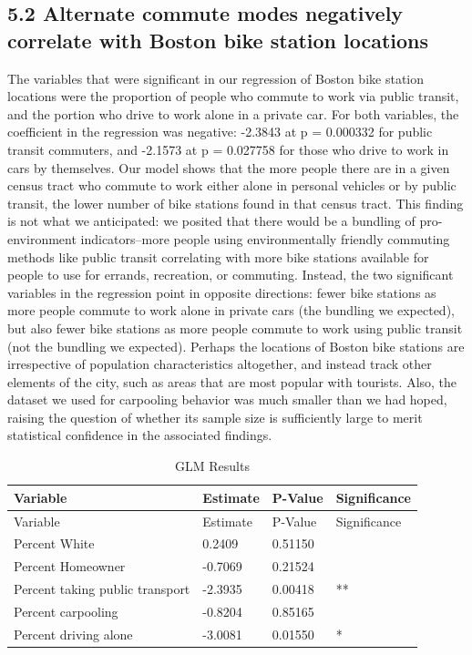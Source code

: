 \documentclass[
  12pt,
]{article}
\begin{document}
\hypertarget{alternate-commute-modes-negatively-correlate-with-boston-bike-station-locations-1}{%
\subsection{5.2 Alternate commute modes negatively correlate with Boston
bike station
locations}\label{alternate-commute-modes-negatively-correlate-with-boston-bike-station-locations-1}}

The variables that were significant in our regression of Boston bike
station locations were the proportion of people who commute to work via
public transit, and the portion who drive to work alone in a private
car. For both variables, the coefficient in the regression was negative:
-2.3843 at p = 0.000332 for public transit commuters, and -2.1573 at p =
0.027758 for those who drive to work in cars by themselves. Our model
shows that the more people there are in a given census tract who commute
to work either alone in personal vehicles or by public transit, the
lower number of bike stations found in that census tract. This finding
is not what we anticipated: we posited that there would be a bundling of
pro-environment indicators--more people using environmentally friendly
commuting methods like public transit correlating with more bike
stations available for people to use for errands, recreation, or
commuting. Instead, the two significant variables in the regression
point in opposite directions: fewer bike stations as more people commute
to work alone in private cars (the bundling we expected), but also fewer
bike stations as more people commute to work using public transit (not
the bundling we expected). Perhaps the locations of Boston bike stations
are irrespective of population characteristics altogether, and instead
track other elements of the city, such as areas that are most popular
with tourists. Also, the dataset we used for carpooling behavior was
much smaller than we had hoped, raising the question of whether its
sample size is sufficiently large to merit statistical confidence in the
associated findings.

\begin{longtable}[]{@{}llll@{}}
\caption{GLM Results}\tabularnewline
\toprule
Variable & Estimate & P-Value & Significance \\
\midrule
\endfirsthead
\toprule
Variable & Estimate & P-Value & Significance \\
\midrule
\endhead
Percent White & 0.2409 & 0.51150 & \\
Percent Homeowner & -0.7069 & 0.21524 & \\
Percent taking public transport & -2.3935 & 0.00418 & ** \\
Percent carpooling & -0.8204 & 0.85165 & \\
Percent driving alone & -3.0081 & 0.01550 & * \\
\bottomrule
\end{longtable}
\end{document}
